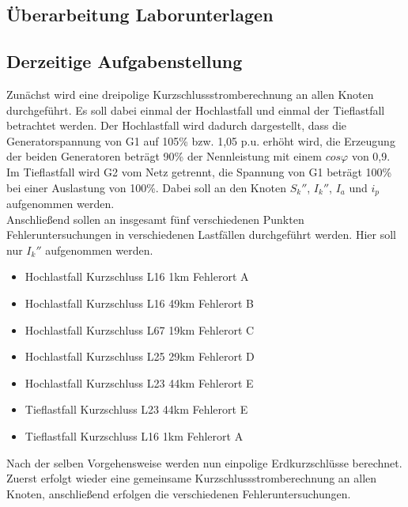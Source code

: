 \documentclass{scrartcl}
\begin{document}
\begin{onehalfspace}
\section{Überarbeitung Laborunterlagen}


\subsection{Derzeitige Aufgabenstellung}
Zunächst wird eine dreipolige Kurzschlussstromberechnung an allen Knoten durchgeführt. Es soll dabei einmal der Hochlastfall und einmal der Tieflastfall betrachtet werden. Der Hochlastfall wird dadurch dargestellt, dass die Generatorspannung von G1 auf 105\% bzw. 1,05 p.u. erhöht wird, die Erzeugung der beiden Generatoren beträgt 90\% der Nennleistung mit einem $cos \varphi $ von 0,9. Im Tieflastfall wird G2 vom Netz getrennt, die Spannung von G1 beträgt 100\% bei einer Auslastung von 100\%. Dabei soll an den Knoten $S_k''$, $I_k''$, $I_a$ und $i_p$ aufgenommen werden. \\
Anschließend sollen an insgesamt fünf verschiedenen Punkten Fehleruntersuchungen in verschiedenen Lastfällen durchgeführt werden. Hier soll nur $I_k''$ aufgenommen werden.

\begin{itemize}
\item Hochlastfall Kurzschluss L16 1km Fehlerort A
\item Hochlastfall Kurzschluss L16 49km Fehlerort B
\item Hochlastfall Kurzschluss L67 19km Fehlerort C
\item Hochlastfall Kurzschluss L25 29km Fehlerort D
\item Hochlastfall Kurzschluss L23 44km Fehlerort E
\item Tieflastfall Kurzschluss L23 44km Fehlerort E
\item Tieflastfall Kurzschluss L16 1km Fehlerort A
\end{itemize}

Nach der selben Vorgehensweise werden nun einpolige Erdkurzschlüsse berechnet. Zuerst erfolgt wieder eine gemeinsame Kurzschlussstromberechnung an allen Knoten, anschließend erfolgen die verschiedenen Fehleruntersuchungen.



\end{onehalfspace}
\end{document}
